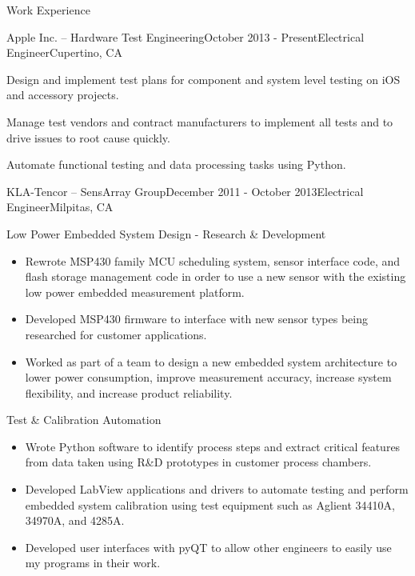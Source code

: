 \documentclass{resume} %
\begin{document}
\vspace{0.5em}
\begin{rSection}{Work Experience}
\vspace{-0.5em}
\begin{rSubsection}{Apple Inc. -- Hardware Test Engineering}{October 2013 - Present}{Electrical Engineer}{Cupertino, CA}
\item Design and implement test plans for component and system level testing on iOS and accessory projects.
\item Manage test vendors and contract manufacturers to implement all tests and to drive issues to root cause quickly.
\item Automate functional testing and data processing tasks using Python.
\end{rSubsection}


\ssquish
\begin{rSubsection2}{KLA-Tencor -- SensArray Group}{December 2011 - October 2013}{Electrical Engineer}{Milpitas, CA}
\item Low Power Embedded System Design - Research \& Development 
\begin{itemize}
\itemsep -0.5em \vspace{-0.5em}
\renewcommand{\labelitemi}{-}
\item Rewrote MSP430 family MCU scheduling system, sensor interface code, and flash storage management code in order to use a new sensor with the existing low power embedded measurement platform.
\item Developed MSP430 firmware to interface with new sensor types being researched for customer applications.
\item Worked as part of a team to design a new embedded system architecture to lower power consumption, improve measurement accuracy, increase system flexibility, and increase product reliability.
\end{itemize}

\item Test \& Calibration Automation
\begin{itemize}
\itemsep -0.5em \vspace{-0.5em}
\renewcommand{\labelitemi}{-}
\item Wrote Python software to identify process steps and extract critical features from data taken using R\&D prototypes in customer process chambers. 
\item Developed LabView applications and drivers to automate testing and perform embedded system calibration using test equipment such as Aglient 34410A, 34970A, and 4285A.
\item Developed user interfaces with pyQT to allow other engineers to easily use my programs in their work.
\end{itemize}
\end{rSubsection2}


\end{rSection}
\end{document}
